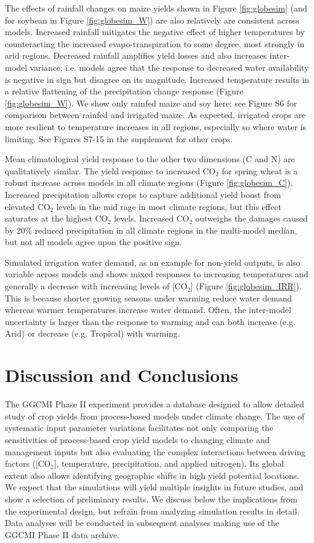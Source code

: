 \documentclass[gmd, manuscript]{copernicus} %
\begin{document}
The effects of rainfall changes on maize yields shown in Figure \ref{fig:globesim} (and for soybean in Figure \ref{fig:globesim_W}) are also relatively are consistent across models. 
Increased rainfall mitigates the negative effect of higher temperatures by counteracting the increased evapo-transpiration to some degree, most strongly in arid regions.
Decreased rainfall amplifies yield losses and also increases inter-model variance; i.e. models agree that the response to decreased water availability is negative in sign but disagree on its magnitude.
Increased temperature results in a relative flattening of the precipitation change response (Figure \ref{fig:globesim_W}).
We show only rainfed maize and soy here; see Figure S6 for comparison between rainfed and irrigated maize. As expected, irrigated crops are more resilient to temperature increases in all regions, especially so where water is limiting. 
See Figures S7-15 in the supplement for other crops.   

Mean climatological yield response to the other two dimensions (C and N) are qualitatively similar. 
The yield response to increased CO$_2$ for spring wheat is a robust increase across models in all climate regions (Figure \ref{fig:globesim_C}). 
Increased precipitation allows crops to capture additional yield boost from elevated CO$_2$ levels in the mid rage in most climate regions, but this effect saturates at the highest CO$_2$ levels. 
Increased CO$_2$ outweighs the damages caused by 20\% reduced precipitation in all climate regions in the multi-model median, but not all models agree upon the positive sign.

Simulated irrigation water demand, as an example for non-yield outputs, is also variable across models and shows mixed responses to increasing temperatures and generally a decrease with increasing levels of [CO$_2$] (Figure \ref{fig:globesim_IRR}). 
This is because shorter growing seasons under warming reduce water demand whereas warmer temperatures increase water demand. 
Often, the inter-model uncertainty is larger than the response to warming and can both increase (e.g. Arid) or decrease (e.g. Tropical) with warming.

\section{Discussion and Conclusions} 
\label{S:5}
The GGCMI Phase II experiment provides a database designed to allow detailed study of crop yields from process-based models under climate change. 
The use of systematic input parameter variations facilitates not only comparing the sensitivities of process-based crop yield models to changing climate and management inputs but also evaluating the complex interactions between driving factors ([CO$_2$], temperature, precipitation, and applied nitrogen). 
Its global extent also allows identifying geographic shifts in high yield potential locations. 
We expect that the simulations will yield multiple insights in future studies, and show a selection of preliminary results. 
We discuss below the implications from the experimental design, but refrain from analyzing simulation results in detail. 
Data analyses will be conducted in subsequent analyses making use of the GGCMI Phase II data archive.
\end{document}
